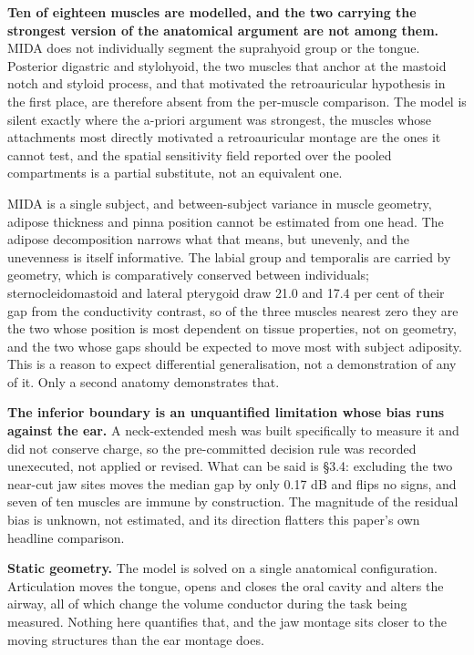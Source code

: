 \documentclass[manuscript,review,anonymous]{acmart}
\begin{document}
\textbf{Ten of eighteen muscles are modelled, and the two carrying the strongest
version of the anatomical argument are not among them.} MIDA does not
individually segment the suprahyoid group or the tongue. Posterior digastric and
stylohyoid, the two muscles that anchor at the mastoid notch and styloid
process, and that motivated the retroauricular hypothesis in the first place,
are therefore absent from the per-muscle comparison. The model is silent exactly
where the a-priori argument was strongest, the muscles whose attachments most
directly motivated a retroauricular montage are the ones it cannot test, and the
spatial sensitivity field reported over the pooled compartments is a partial
substitute, not an equivalent one.

MIDA is a single subject, and between-subject variance in muscle geometry,
adipose thickness and pinna position cannot be estimated from one head. The
adipose decomposition narrows what that means, but unevenly, and the unevenness
is itself informative. The labial group and temporalis are carried by geometry,
which is comparatively conserved between individuals; sternocleidomastoid and
lateral pterygoid draw 21.0 and 17.4 per cent of their gap from the conductivity
contrast, so of the three muscles nearest zero they are the two whose position
is most dependent on tissue properties, not on geometry, and the two whose gaps
should be expected to move most with subject adiposity. This is a reason to
expect differential generalisation, not a demonstration of any of it. Only a
second anatomy demonstrates that.

\textbf{The inferior boundary is an unquantified limitation whose bias runs against
the ear.} A neck-extended mesh was built specifically to measure it and did not
conserve charge, so the pre-committed decision rule was recorded unexecuted, not
applied or revised. What can be said is \S{}3.4: excluding the two near-cut jaw
sites moves the median gap by only \textminus{}0.17 dB and flips no signs, and seven of ten
muscles are immune by construction. The magnitude of the residual bias is
unknown, not estimated, and its direction flatters this paper's own headline
comparison.

\textbf{Static geometry.} The model is solved on a single anatomical configuration.
Articulation moves the tongue, opens and closes the oral cavity and alters the
airway, all of which change the volume conductor during the task being measured.
Nothing here quantifies that, and the jaw montage sits closer to the moving
structures than the ear montage does.
\end{document}
